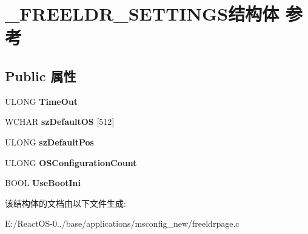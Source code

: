 \hypertarget{struct___f_r_e_e_l_d_r___s_e_t_t_i_n_g_s}{}\section{\+\_\+\+F\+R\+E\+E\+L\+D\+R\+\_\+\+S\+E\+T\+T\+I\+N\+G\+S结构体 参考}
\label{struct___f_r_e_e_l_d_r___s_e_t_t_i_n_g_s}
\subsection*{Public 属性}
\begin{DoxyCompactItemize}
\item 
\mbox{\label{struct___f_r_e_e_l_d_r___s_e_t_t_i_n_g_s_a5845dc155f50da4235b0525ca0485415}} 
U\+L\+O\+NG {\bfseries Time\+Out}
\item 
\mbox{\label{struct___f_r_e_e_l_d_r___s_e_t_t_i_n_g_s_a76d99e7380cd1f011e4e8410553aa55a}} 
W\+C\+H\+AR {\bfseries sz\+Default\+OS} \mbox{[}512\mbox{]}
\item 
\mbox{\label{struct___f_r_e_e_l_d_r___s_e_t_t_i_n_g_s_ae8e272cc42cfea45fc8b87c23f9c5c1a}} 
U\+L\+O\+NG {\bfseries sz\+Default\+Pos}
\item 
\mbox{\label{struct___f_r_e_e_l_d_r___s_e_t_t_i_n_g_s_abfe7d4d41d9d93ad2f01febdfc3a16fd}} 
U\+L\+O\+NG {\bfseries O\+S\+Configuration\+Count}
\item 
\mbox{\label{struct___f_r_e_e_l_d_r___s_e_t_t_i_n_g_s_a95990e912c6742afb7560a611e88ee5e}} 
B\+O\+OL {\bfseries Use\+Boot\+Ini}
\end{DoxyCompactItemize}


该结构体的文档由以下文件生成\+:\begin{DoxyCompactItemize}
\item 
E\+:/\+React\+O\+S-\/0../base/applications/msconfig\+\_\+new/freeldrpage.\+c\end{DoxyCompactItemize}
